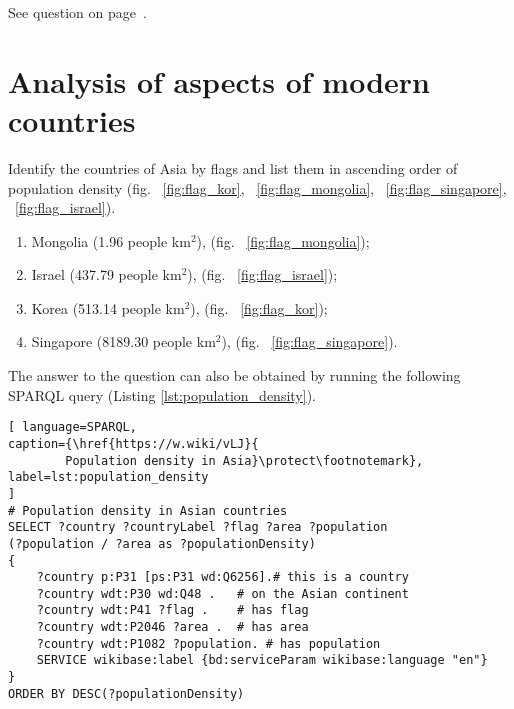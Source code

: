 See question on page~\pageref{question:cities_flags}.

\section{Analysis of aspects of modern countries}
\begin{exercise}
\label{answer:population_density}
Identify the countries of Asia by flags and list them in ascending order of population density (fig. ~\ref{fig:flag_kor}, ~\ref{fig:flag_mongolia}, ~\ref{fig:flag_singapore}, ~\ref{fig:flag_israel}).
\end{exercise}

\begin{enumerate}
\item Mongolia (\num{1.96} people km\begin{math}^2\end{math}), (fig. ~\ref{fig:flag_mongolia});
\item Israel (\num{437.79} people km\begin{math}^2\end{math}), (fig. ~\ref{fig:flag_israel});
\item Korea (\num{513.14} people km\begin{math}^2\end{math}), (fig. ~\ref{fig:flag_kor});
\item Singapore (\num{8189.30} people km\begin{math}^2\end{math}), (fig. ~\ref{fig:flag_singapore}).
\end{enumerate}

The answer to the question can also be obtained by running the following SPARQL query (Listing \ref{lst:population_density}).

\begin{lstlisting}[ language=SPARQL, 
caption={\href{https://w.wiki/vLJ}{
		Population density in Asia}\protect\footnotemark},
label=lst:population_density
]
# Population density in Asian countries
SELECT ?country ?countryLabel ?flag ?area ?population 
(?population / ?area as ?populationDensity)
{
	?country p:P31 [ps:P31 wd:Q6256].# this is a country
	?country wdt:P30 wd:Q48 .   # on the Asian continent 
	?country wdt:P41 ?flag .    # has flag
	?country wdt:P2046 ?area .  # has area
	?country wdt:P1082 ?population. # has population  
	SERVICE wikibase:label {bd:serviceParam wikibase:language "en"}
}
ORDER BY DESC(?populationDensity)
\end{lstlisting}


